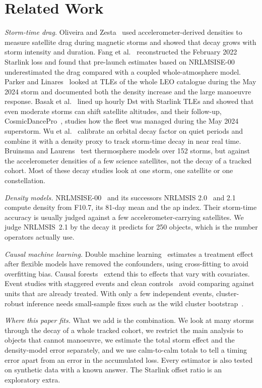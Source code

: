 \section{Related Work}
\label{sec:related}

\textit{Storm-time drag.} Oliveira and Zesta~\cite{oliveira2019drag} used accelerometer-derived
densities to measure satellite drag during magnetic storms and showed that decay grows with
storm intensity and duration. Fang et al.~\cite{fang2022starlink} reconstructed the February
2022 Starlink loss and found that pre-launch estimates based on NRLMSISE-00 underestimated the
drag compared with a coupled whole-atmosphere model. Parker and Linares~\cite{parker2024gannon}
looked at TLEs of the whole LEO catalogue during the May 2024 storm and documented both the
density increase and the large manoeuvre response. Basak et al.~\cite{basak2024cosmicdance}
lined up hourly Dst with Starlink TLEs and showed that even moderate storms can shift satellite
altitudes, and their follow-up, CosmicDancePro~\cite{basak2026cosmicdancepro}, studies how the
fleet was managed during the May 2024 superstorm. Wu et al.~\cite{wu2025decay} calibrate an
orbital decay factor on quiet periods and combine it with a density proxy to track storm-time
decay in near real time. Bruinsma and Laurens~\cite{bruinsma2024storms} test thermosphere models
over 152 storms, but against the accelerometer densities of a few science satellites, not the
decay of a tracked cohort. Most of these decay studies look at one storm, one satellite or one
constellation.

\textit{Density models.} NRLMSISE-00~\cite{picone2002nrlmsise} and its successors NRLMSIS
2.0~\cite{emmert2021nrlmsis} and 2.1~\cite{emmert2022msis21} compute density from F10.7, its
81-day mean and the ap index. Their storm-time accuracy is usually judged against a few
accelerometer-carrying satellites. We judge NRLMSIS~2.1 by the decay it predicts for 250
objects, which is the number operators actually use.

\textit{Causal machine learning.} Double machine learning~\cite{chernozhukov2018dml} estimates a
treatment effect after flexible models have removed the confounders, using cross-fitting to
avoid overfitting bias. Causal forests~\cite{wager2018forest,athey2019grf} extend this to
effects that vary with covariates. Event studies with staggered events and clean
controls~\cite{cengiz2019stacked,sun2021eventstudy,callaway2021did} avoid comparing against
units that are already treated. With only a few independent events, cluster-robust inference
needs small-sample fixes such as the wild cluster
bootstrap~\cite{cameron2008bootstrap,webb2023wild}.

\textit{Where this paper fits.} What we add is the combination. We look at many storms through
the decay of a whole tracked cohort, we restrict the main analysis to objects that cannot
manoeuvre, we estimate the total storm effect and the density-model error separately, and we
use calm-to-calm totals to tell a timing error apart from an error in the accumulated loss.
Every estimator is also tested on synthetic data with a known answer. The Starlink offset ratio
is an exploratory extra.
